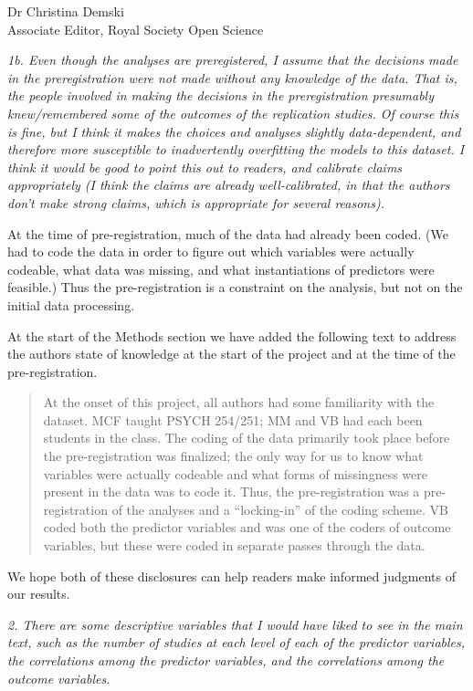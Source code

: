 \documentclass{stanfordletter}
\newcommand{\theysaid}[1]{\begin{leftbar} \noindent 
		\textsl{ #1}\end{leftbar}}
\newcommand{\revised}[1]{\begin{quote}	#1 \end{quote}}
\begin{document}
\begin{letter}{Dr Christina Demski \\ Associate Editor, Royal Society Open Science}
          \theysaid{
          	1b. Even though the analyses are preregistered, I assume that the decisions made in the preregistration were not made without any knowledge of the data.  That is, the people involved in making the decisions in the preregistration presumably knew/remembered some of the outcomes of the replication studies.  Of course this is fine, but I think it makes the choices and analyses slightly data-dependent, and therefore more susceptible to inadvertently overfitting the models to this dataset. I think it would be good to point this out to readers, and calibrate claims appropriately (I think the claims are already well-calibrated, in that the authors don't make strong claims, which is appropriate for several reasons).
          }
          
          At the time of pre-registration, much of the data had already been coded. (We had to code the data in order to figure out which variables were actually codeable, what data was missing, and what instantiations of predictors were feasible.)  Thus the pre-registration is a constraint on the analysis, but not on the initial data processing. 
          
          At the start of the Methods section we have added the following text to address the authors state of knowledge at the start of the project and at the time of the pre-registration. 
          
          \revised{At the onset of this project, all authors had some familiarity with the dataset. MCF taught PSYCH 254/251; MM and VB had each been students in the class. The coding of the data primarily took place before the pre-registration was finalized; the only way for us to know what variables were actually codeable and what forms of missingness were present in the data was to code it. Thus, the pre-registration was a pre-registration of the analyses and a ``locking-in'' of the coding scheme. VB coded both the predictor variables and was one of the coders of outcome variables, but these were coded in separate passes through the data.}
          
          We hope both of these disclosures can help readers make informed judgments of our results. 
          
          
          \theysaid{
          	2. There are some descriptive variables that I would have liked to see in the main text, such as the number of studies at each level of each of the predictor variables, the correlations among the predictor variables, and the correlations among the outcome variables.
          }
          

\end{letter}
\end{document}
